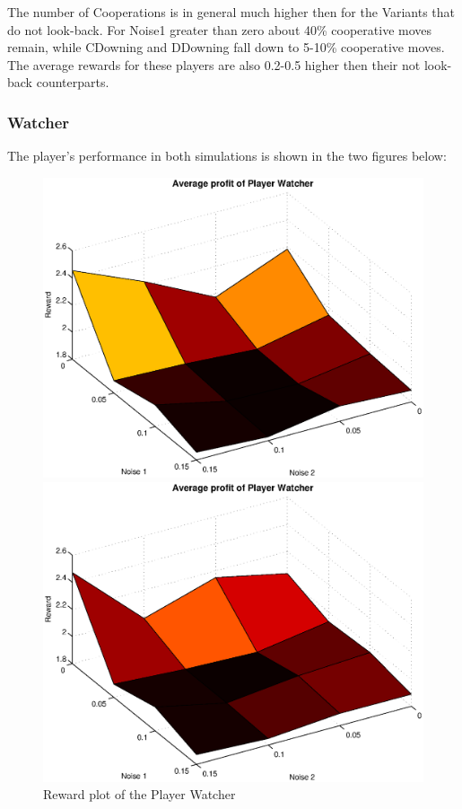 The number of Cooperations is in general much higher then for the Variants that do not look-back. For Noise1 greater than zero about 40\% cooperative moves remain, while CDowning and DDowning fall down to 5-10\% cooperative moves. The average rewards for these players are also 0.2-0.5 higher then their not look-back counterparts.

\newpage
\subsubsection{Watcher}
The player's performance in both simulations is shown in the two figures below:
\begin{figure}[h]

\begin{minipage}[hbt]{0.65\textwidth}
	\centering
	\includegraphics[width=\textwidth]{pics/simulation1/Reward_vs_Noise_of_Player_Watcher}
\end{minipage}
\hfill
\begin{minipage}[hbt]{0.3\textwidth}
	\centering
	\includegraphics[width=\textwidth]{pics/simulation2/Reward_vs_Noise_of_Player_Watcher}
\end{minipage}
	\caption{Reward plot of the Player Watcher}
	\label{pic player watcher}
\end{figure}

